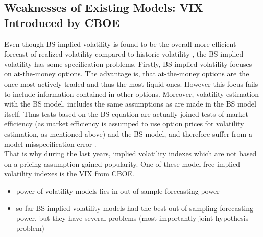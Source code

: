 \subsection{Weaknesses of Existing Models: VIX Introduced by CBOE}\label{sec:12Weakness}
Even though BS implied volatility is found to be the overall more efficient forecast of realized volatility compared to historic volatility \parencite{jiang2003}, the \gls{BS} implied volatility has some specification problems. Firstly, \gls{BS} implied volatility focuses on at-the-money options. The advantage is, that at-the-money options are the once most actively traded and thus the most liquid ones. However this focus fails to include information contained in other options. Moreover, volatility estimation with the \gls{BS} model, includes the same assumptions as are made in the \gls{BS} model itself. Thus tests based on the \gls{BS} equation are actually joined tests of market efficiency (as market efficiency is assumped to use option prices for volatility estimation, as mentioned above) and the \gls{BS} model, and therefore suffer from a model misspecification error \parencite{jiang2003}. \\
That is why during the last years, implied volatility indexes which are not based on a pricing assumption gained popularity. One of these model-free implied volatility indexes is the VIX from CBOE.

\begin{itemize}\itemsep0pt
\item power of volatility models lies in out-of-sample forecasting power
\item so far \gls{BS} implied volatility models had the best out of sampling forecasting power, but they have several problems (most importantly joint hypothesis problem) 
\end{itemize}



